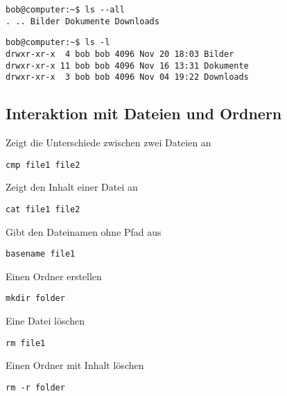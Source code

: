\begin{lstlisting}[style=terminal]
bob@computer:~$ ls --all
. .. Bilder Dokumente Downloads
\end{lstlisting}

\begin{lstlisting}[style=terminal]
bob@computer:~$ ls -l
drwxr-xr-x  4 bob bob 4096 Nov 20 18:03 Bilder
drwxr-xr-x 11 bob bob 4096 Nov 16 13:31 Dokumente
drwxr-xr-x  3 bob bob 4096 Nov 04 19:22 Downloads
\end{lstlisting}

\subsection {Interaktion mit Dateien und Ordnern}

\begin{multicols}{2}
Zeigt die Unterschiede zwischen zwei Dateien an
\begin{lstlisting}
cmp file1 file2
\end{lstlisting}
\columnbreak
Zeigt den Inhalt einer Datei an
\begin{lstlisting}
cat file1 file2
\end{lstlisting}
\end{multicols}

\begin{multicols}{2}
Gibt den Dateinamen ohne Pfad aus
\begin{lstlisting}
basename file1
\end{lstlisting}
\columnbreak
Einen Ordner erstellen
\begin{lstlisting}
mkdir folder
\end{lstlisting}
\end{multicols}

\begin{multicols}{2}
Eine Datei löschen
\begin{lstlisting}
rm file1
\end{lstlisting}
\columnbreak
Einen Ordner mit Inhalt löschen
\begin{lstlisting}
rm -r folder
\end{lstlisting}
\end{multicols}

